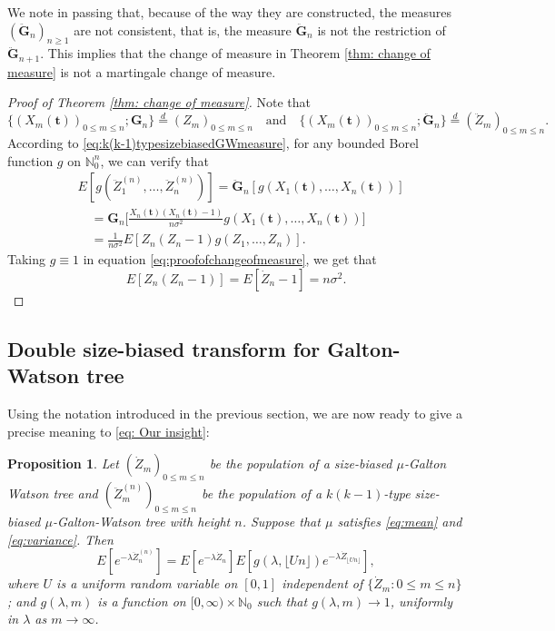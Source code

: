 \documentclass[UTF8]{pkuthss}
\theoremstyle{plain}
\newtheorem{prop}[thm]{Proposition}
\theoremstyle{definition}
\numberwithin{equation}{section}
\begin{document}
We note in passing that, because of the way they are constructed, the measures $(\ddot{\mathbf G}_n)_{n\ge 1}$ are not consistent, that is, the measure $\ddot{\mathbf G}_n$ is not the restriction of $\ddot{\mathbf G}_{n+1}$.
This implies that the change of measure in Theorem \ref{thm: change of measure} is not a martingale change of measure.
\medskip
\begin{proof}[Proof of Theorem \ref{thm: change of measure}]
	Note that
	\[
	\{(X_m( \mathbf t ))_{0\le m\le n}; {\mathbf G}_n\}  \overset{d}{=} (Z_m)_{0\le m\le n}
	\quad    \mbox{and} \quad \{(X_m( \mathbf t ))_{0\le m\le n};\ddot{\mathbf G}_n\}  \overset{d}{=} (\ddot Z_m)_{0\le m\le n}.
	\]
	According to \eqref{eq:k(k-1)typesizebiasedGWmeasure}, for any bounded Borel function $g$ on $\mathbb N_0^n$, we can verify that
\begin{align} \label{eq:proofofchangeofmeasure}
	&E [ g ( \ddot Z_1^{(n)}, \dots, \ddot Z_n^{(n)})]
	= \ddot{\mathbf G}_n [g ( X_1(  \mathbf t ), \dots, X_n(  \mathbf t ))]
	\\ &\quad = {\mathbf G}_n \big[ \frac { X_n( \mathbf t ) ( X_n( \mathbf t ) - 1)} {n \sigma^2} g (X_1( \mathbf t ), \dots, X_n( \mathbf t ))\big]
	\\&\quad = \frac { 1} { n \sigma^2} E[ Z_n ( Z_n - 1) g( Z_1, \dots, Z_n)].
\end{align}
	Taking $g\equiv 1$ in equation \eqref{eq:proofofchangeofmeasure}, we get that
	\begin{equation}
	\label{eq: second moment}
	E [Z_n(Z_n-1)]= E [\dot Z_n - 1]= n\sigma^2.
	\end{equation}
\end{proof}

\subsection{Double size-biased transform for Galton-Watson tree}
\label{sec:spinesdecomposition}

	Using the notation introduced in the previous section, we are now ready to give a precise meaning to \eqref{eq: Our insight}:
\begin{prop}
\label{prop: size-biased add-on of size-biased tree }
	Let $(\dot Z_m)_{0 \leq m \leq n}$ be the population of a size-biased $\mu$-Galton Watson tree and $(\ddot Z^{(n)}_m)_{0 \leq m \leq n}$ be the population of a $k(k-1)$-type size-biased $\mu$-Galton-Watson tree with height $n$.
	Suppose that $\mu$ satisfies \eqref{eq:mean} and \eqref{eq:variance}.
	Then
\[
	E [ e^{- \lambda \ddot Z_n^{(n)}} ]
	 = E [e^{-\lambda \dot Z_n}] E[g(\lambda, \lfloor Un \rfloor )e^{-\lambda \dot Z_{ \lfloor Un \rfloor}}],
\]
	where $U$ is a uniform random variable on $[0,1]$ independent of $\{\dot Z_m: 0\le m\le n\}$;
	and $g(\lambda, m)$ is a function on $[0,\infty) \times \mathbb N_0$ such that
	$g(\lambda, m) \to 1$, uniformly in $\lambda$ as $m\to \infty$.
\end{prop}
\end{document}
